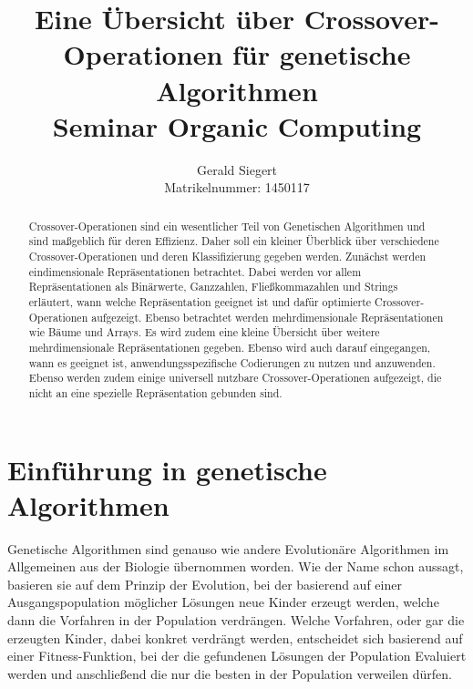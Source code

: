 \documentclass{llncs}
\begin{document}
\mainmatter

\title{Eine Übersicht über Crossover-Operationen für genetische Algorithmen\\Seminar Organic Computing}

\author{Gerald Siegert\\Matrikelnummer: 1450117}
\tocauthor{}


\maketitle


\begin{abstract}
	Crossover-Operationen sind ein wesentlicher Teil von Genetischen Algorithmen und sind maßgeblich für deren Effizienz. Daher soll ein kleiner Überblick über verschiedene Crossover-Operationen und deren Klassifizierung gegeben werden. Zunächst werden eindimensionale Re\-prä\-sen\-ta\-ti\-on\-en betrachtet. Dabei werden vor allem Repräsentationen als Binärwerte, Ganzzahlen, Fließkommazahlen und Strings  erläutert, wann welche Repräsentation geeignet ist und dafür optimierte Crossover-Operationen aufgezeigt. Ebenso betrachtet werden mehrdimensionale Re\-prä\-sen\-ta\-ti\-on\-en wie Bäume und Arrays. Es wird zudem eine kleine Über\-sicht über weitere mehrdimensionale Repräsentationen gegeben. Ebenso wird auch darauf eingegangen, wann es geeignet ist, anwendungsspezifische Codierungen zu nutzen und anzuwenden. Ebenso werden zudem einige universell nutzbare Crossover-Operationen aufgezeigt, die nicht an eine spezielle Repräsentation gebunden sind.
\end{abstract}

\pagebreak

\section{Einführung in genetische Algorithmen}
\label{sec:EinfuhrungGA}

	Genetische Algorithmen sind genauso wie andere Evolutionäre Algorithmen im Allgemeinen aus der Biologie übernommen worden. Wie der Name schon aussagt, basieren sie auf dem Prinzip der Evolution, bei der basierend auf einer Ausgangspopulation möglicher Lösungen neue Kinder erzeugt werden, welche dann die Vorfahren in der Population verdrängen. Welche Vorfahren, oder gar die erzeugten Kinder, dabei konkret verdrängt werden, entscheidet sich basierend auf einer Fitness-Funktion, bei der die gefundenen Lösungen der Population Evaluiert werden und anschließend die nur die besten in der Population verweilen dürfen.
	
\end{document}
